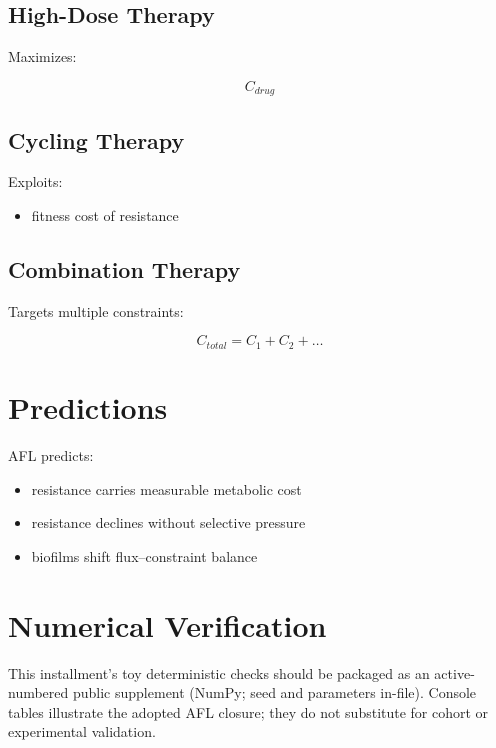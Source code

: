 \documentclass[11pt]{article}
\begin{document}
\subsection{High-Dose Therapy}

Maximizes:

\begin{equation}
C_{drug}
\end{equation}

\subsection{Cycling Therapy}

Exploits:

\begin{itemize}
    \item fitness cost of resistance
\end{itemize}

\subsection{Combination Therapy}

Targets multiple constraints:

\begin{equation}
C_{total} = C_1 + C_2 + \dots
\end{equation}

\section{Predictions}

AFL predicts:

\begin{itemize}
    \item resistance carries measurable metabolic cost
    \item resistance declines without selective pressure
    \item biofilms shift flux–constraint balance
\end{itemize}

\section{Numerical Verification}
This installment's toy deterministic checks should be packaged as an active-numbered public supplement (NumPy; seed and parameters in-file). Console tables illustrate the adopted AFL closure; they do not substitute for cohort or experimental validation.
\end{document}
